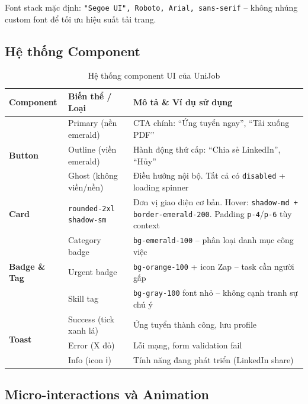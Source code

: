 Font stack mặc định: \texttt{"Segoe UI", Roboto, Arial, sans-serif} -- không nhúng custom
font để tối ưu hiệu suất tải trang.

\subsection{Hệ thống Component}

\begin{table}[H]
\centering
\caption{Hệ thống component UI của UniJob}
\renewcommand{\arraystretch}{1.2}
\begin{tabularx}{\textwidth}{|p{2.5cm}|p{3.5cm}|X|}
\hline
\rowcolor{emeraldrow}
\textbf{\color{emeraldhead}Component} &
\textbf{\color{emeraldhead}Biến thể / Loại} &
\textbf{\color{emeraldhead}Mô tả \& Ví dụ sử dụng} \\
\hline
\multirow{3}{*}{\textbf{Button}} &
  Primary (nền emerald) & CTA chính: ``Ứng tuyển ngay'', ``Tải xuống PDF'' \\
\cline{2-3}
& Outline (viền emerald) & Hành động thứ cấp: ``Chia sẻ LinkedIn'', ``Hủy'' \\
\cline{2-3}
& Ghost (không viền/nền) & Điều hướng nội bộ. Tất cả có \texttt{disabled} + loading spinner \\
\hline
\textbf{Card} &
  \texttt{rounded-2xl shadow-sm} &
  Đơn vị giao diện cơ bản. Hover: \texttt{shadow-md + border-emerald-200}.
  Padding \texttt{p-4}/\texttt{p-6} tùy context \\
\hline
\multirow{3}{*}{\textbf{Badge \& Tag}} &
  Category badge & \texttt{bg-emerald-100} -- phân loại danh mục công việc \\
\cline{2-3}
& Urgent badge & \texttt{bg-orange-100} + icon Zap -- task cần người gấp \\
\cline{2-3}
& Skill tag & \texttt{bg-gray-100} font nhỏ -- không cạnh tranh sự chú ý \\
\hline
\multirow{3}{*}{\textbf{Toast}} &
  Success (tick xanh lá) & Ứng tuyển thành công, lưu profile \\
\cline{2-3}
& Error (X đỏ) & Lỗi mạng, form validation fail \\
\cline{2-3}
& Info (icon ℹ) & Tính năng đang phát triển (LinkedIn share) \\
\hline
\end{tabularx}
\end{table}

\subsection{Micro-interactions và Animation}

